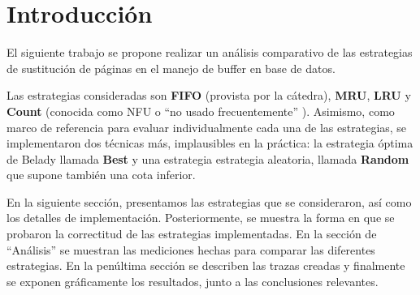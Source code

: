 \section{Introducci\'on}

El siguiente trabajo se propone realizar un an\'alisis comparativo de las estrategias de sustituci\'on de p\'aginas 
en el manejo de buffer en base de datos. 

Las estrategias consideradas son \textbf{FIFO} (provista por la c\'atedra), \textbf{MRU}, \textbf{LRU} y \textbf{Count} (conocida como NFU o ``no usado frecuentemente'' \cite{wiki1}). Asimismo, 
como marco de referencia para evaluar individualmente cada una de las estrategias, se implementaron dos t\'ecnicas m\'as, 
implausibles en la pr\'actica: la estrategia \'optima de Belady \cite{bel66} llamada \textbf{Best} y una estrategia 
estrategia aleatoria, llamada \textbf{Random} que supone tambi\'en una cota inferior.

En la siguiente secci\'on, presentamos las estrategias que se consideraron, as\'i como los detalles de implementaci\'on. 
Posteriormente, se muestra la forma en que se probaron la correctitud de las estrategias implementadas. 
En la secci\'on de ``An\'alisis'' se muestran las mediciones hechas para comparar las diferentes estrategias. 
En la pen\'ultima secci\'on se describen las trazas creadas y finalmente se exponen gr\'aficamente los resultados, 
junto a las conclusiones relevantes.
